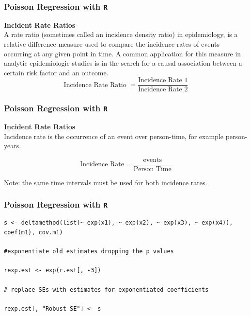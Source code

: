 \documentclass[00-GLMregslides.tex]{subfiles}
\begin{document}
\begin{frame}[fragile]

\frametitle{Poisson Regression with \texttt{R}}
\Large 
\textbf{Incident Rate Ratios}\\
A rate ratio (sometimes called an incidence density ratio) in epidemiology, is a relative difference measure used to compare the incidence rates of events occurring at any given point in time. A common application for this measure in analytic epidemiologic studies is in the search for a causal association between a certain risk factor and an outcome.
\[ \mbox{Incidence Rate Ratio }  = \frac{\mbox{Incidence Rate 1}}{\mbox{Incidence Rate 2}} \]
\end{frame}
\begin{frame}[fragile]

\frametitle{Poisson Regression with \texttt{R}}
\Large 
\textbf{Incident Rate Ratios} \\
Incidence rate is the occurrence of an event over person-time, for example person-years.
 
\[ \mbox{Incidence Rate}  = \frac{\mbox{events}}{\mbox{Person Time}} \]

Note: the same time intervals must be used for both incidence rates.
\end{frame}
\begin{frame}[fragile]

\frametitle{Poisson Regression with \texttt{R}}


\begin{framed}
\begin{verbatim}
s <- deltamethod(list(~ exp(x1), ~ exp(x2), ~ exp(x3), ~ exp(x4)), coef(m1), cov.m1)

#exponentiate old estimates dropping the p values

rexp.est <- exp(r.est[, -3])

# replace SEs with estimates for exponentiated coefficients

rexp.est[, "Robust SE"] <- s

\end{verbatim}
\end{framed}
\end{frame}
\end{document}
